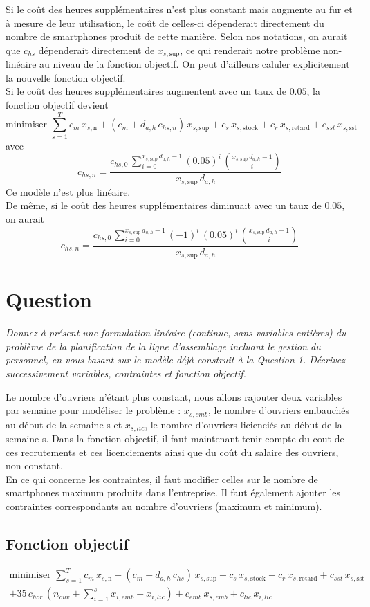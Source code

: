 \documentclass[12pt,oneside,a4paper]{article}
\newcommand{\question}
{
\addtocounter{section}{1}
\section*{Question \thesection}
}
\newcommand{\myX}[2]{x_{#1,\text{#2}}}
\newcommand{\xSemaine}[1]{\myX{s}{#1}}
\newcommand{\xn}{\xSemaine{n}}
\newcommand{\xsup}{\xSemaine{sup}}
\newcommand{\xstock}{\xSemaine{stock}}
\newcommand{\xretard}{\xSemaine{retard}}
\newcommand{\xsst}{\xSemaine{sst}}
\begin{document}
Si le coût des heures supplémentaires n'est plus constant mais augmente au fur et à mesure de leur utilisation, le coût de celles-ci dépenderait directement du nombre de smartphones produit de cette manière.
Selon nos notations, on aurait que $c_{hs}$ dépenderait directement de $\xsup$, ce qui renderait notre problème non-linéaire au niveau de la fonction objectif.
On peut d'ailleurs caluler explicitement la nouvelle fonction objectif. \\
Si le coût des heures supplémentaires augmentent avec un taux de $0.05$, la fonction objectif devient 
\[
  \mbox{minimiser } 
  \sum_{s=1}^{T} 
  c_m\, \xn + (c_m + d_{a,h} \, c_{hs, n})\, \xsup
  + c_s\, \xstock + c_r\, \xretard + c_{sst}\, \xsst
\]
avec \[c_{hs, n} = \frac{c_{hs, 0} \, \sum_{i=0}^{\xsup \, d_{a, h}-1} (0.05)^{i} \, {\xsup \, d_{a,h} -1 \choose i}}{\xsup \, d_{a,h}}\] Ce modèle n'est plus linéaire. \\
De même, si le coût des heures supplémentaires diminuait avec un taux de $0.05$, on aurait  \[c_{hs, n} = \frac{c_{hs, 0} \, \sum_{i=0}^{\xsup \, d_{a, h}-1}(-1)^{i} \, (0.05)^{i} \, {\xsup \, d_{a,h} -1 \choose i}}{\xsup \, d_{a,h}}\]


\question %
\emph{Donnez à présent une formulation linéaire (continue, sans variables
entières) du problème de la planification de la ligne d'assemblage
incluant le gestion du personnel, en vous basant sur le modèle déjà 
construit à la Question 1. Décrivez successivement variables, 
contraintes et fonction objectif.}

Le nombre d'ouvriers n'étant plus constant, nous allons rajouter deux variables par semaine pour modéliser le problème : $x_{s,emb}$, le nombre d'ouvriers embauchés au début de la semaine s et $x_{s,lic}$, le nombre d'ouvriers licienciés au début de la semaine s. Dans la fonction objectif, il faut maintenant tenir compte du cout de ces recrutements et ces licenciements ainsi que du coût du salaire des ouvriers, non constant. \\
En ce qui concerne les contraintes, il faut modifier celles sur le nombre de smartphones maximum produits dans l'entreprise. Il faut également ajouter les contraintes correspondants au nombre d'ouvriers (maximum et minimum).

\subsection*{Fonction objectif}
\begin{multline*}
  \mbox{minimiser } 
  \sum_{s=1}^{T} 
  c_m\, \xn + (c_m + d_{a,h} \, c_{hs})\, \xsup
  + c_s\, \xstock + c_r\, \xretard + c_{sst}\, \xsst \\
  + 35 \, c_{hor} \, (n_{ouv} + \sum_{i=1}^{s} x_{i,emb} - x_{i,lic}) 
  + c_{emb} \, x_{s,emb} + c_{lic} \, x_{i,lic}
\end{multline*}
\end{document}
